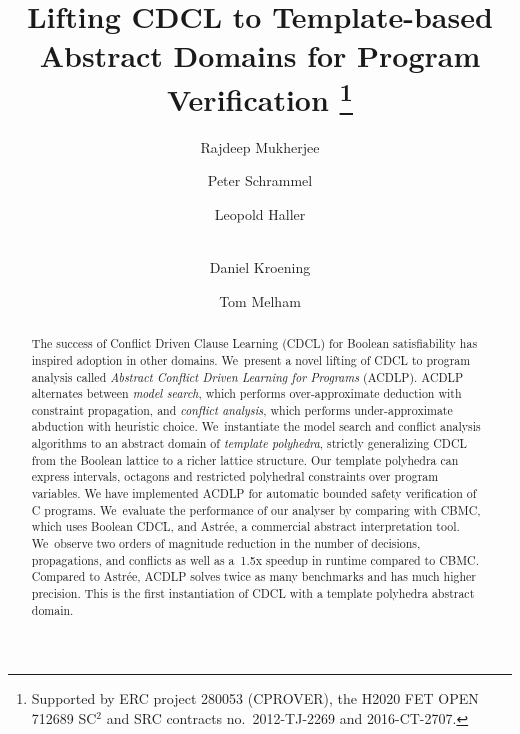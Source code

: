 \documentclass[runningheads,a4paper]{llncs}
\begin{document}
\title{Lifting CDCL to Template-based Abstract Domains
for Program Verification%
\thanks{Supported by ERC project
280053 (CPROVER), the H2020 FET OPEN 712689 SC$^2$
and SRC contracts no.~2012-TJ-2269 and
2016-CT-2707.}}

\author{Rajdeep Mukherjee \and Peter Schrammel \and 
Leopold Haller \and \\ 
Daniel Kroening \and Tom Melham}



\maketitle

\begin{abstract}
%
The success of Conflict Driven Clause Learning (CDCL) for Boolean
satisfiability has inspired adoption in other domains.  We~present a novel
lifting of CDCL to program analysis called \emph{Abstract Conflict Driven
Learning for Programs} (ACDLP).  ACDLP alternates between \emph{model
search}, which performs over-approximate deduction with constraint
propagation, and \emph{conflict analysis}, which performs under-approximate
abduction with heuristic choice.  We~instantiate the model search and
conflict analysis algorithms to an abstract domain of \textit{template
polyhedra}, strictly generalizing CDCL from the Boolean lattice to a richer
lattice structure.  Our template polyhedra can express intervals, octagons
and restricted polyhedral constraints over program variables.  We have
implemented ACDLP for automatic bounded safety verification of C programs. 
We~evaluate the performance of our analyser by comparing with CBMC, which
uses Boolean CDCL, and Astr{\'e}e, a commercial abstract interpretation tool. 
We~observe two orders of magnitude reduction in the number of decisions,
propagations, and conflicts as well as a~1.5x speedup in runtime compared to
CBMC.  Compared to Astr{\'e}e, ACDLP solves twice as many benchmarks and has
much higher precision.  This is the first instantiation of CDCL with a
template polyhedra abstract domain.
%
\end{abstract}
\end{document}
